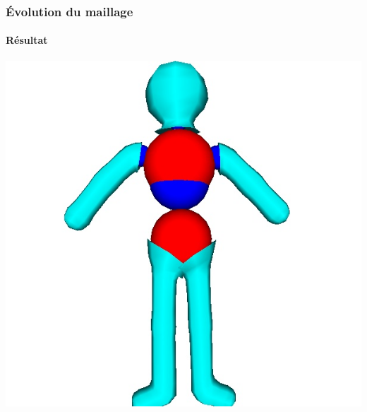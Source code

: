 \documentclass[9pt]{beamer}
\begin{document}
\begin{frame}
	\frametitle{Évolution du maillage}
	\framesubtitle{Résultat}
	
	\begin{center}
		\includegraphics[scale=0.45]{images/meshevolve.jpg}
	\end{center}
\end{frame}
\end{document}
